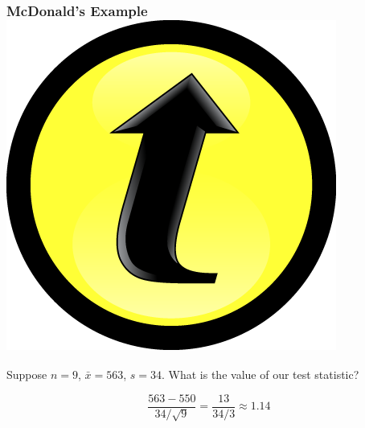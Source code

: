 \documentclass[handout]{beamer}
\begin{document}
\begin{frame}
\frametitle{McDonald's Example\hfill \includegraphics[scale = 0.05]{./images/clicker}}
Suppose $n=9$, $\bar{x} = 563$, $s = 34$. What is  the value of our test statistic?

\pause
\vspace{1em}
	$$\frac{563 - 550}{34/\sqrt{9}}= \frac{13}{34/3} \approx 1.14$$


\end{frame}
\end{document}
